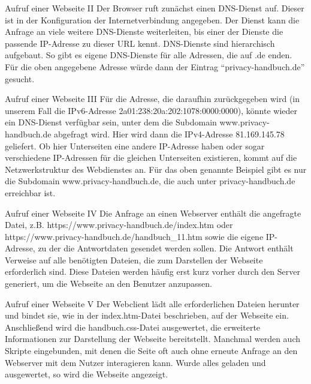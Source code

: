 \documentclass[hyperref={colorlinks,linkcolor=white}, utf8]{beamer}
\begin{document}
	\begin{frame}{Aufruf einer Webseite II}
		Der Browser ruft zunächst einen DNS-Dienst auf. Dieser ist in der Konfiguration der Internetverbindung angegeben. Der Dienst kann die Anfrage an viele weitere DNS-Dienste weiterleiten, bis einer der Dienste die passende IP-Adresse zu dieser URL kennt.
		DNS-Dienste sind hierarchisch aufgebaut. So gibt es eigene DNS-Dienste für alle Adressen, die auf .de enden. Für die oben angegebene Adresse würde dann der Eintrag \enquote{privacy-handbuch.de} gesucht.
	\end{frame}

	\begin{frame}{Aufruf einer Webseite III}
		Für die Adresse, die daraufhin zurückgegeben wird  (in unserem Fall die IPv6-Adresse 2a01:238:20a:202:1078:0000:0000), könnte wieder ein DNS-Dienst verfügbar sein, unter dem die Subdomain www.privacy-handbuch.de abgefragt wird. Hier wird dann die IPv4-Adresse 81.169.145.78 geliefert. Ob hier Unterseiten eine andere IP-Adresse haben oder sogar verschiedene IP-Adressen für die gleichen Unterseiten existieren, kommt auf die Netzwerkstruktur des Webdienstes an. Für das oben genannte Beispiel gibt es nur die Subdomain www.privacy-handbuch.de, die auch unter privacy-handbuch.de erreichbar ist.
	\end{frame}

	\begin{frame}{Aufruf einer Webseite IV}
		Die Anfrage an einen Webserver enthält die angefragte Datei, z.B. https://www.privacy-handbuch.de/index.htm oder https://www.privacy-handbuch.de/handbuch\_11.htm sowie die eigene IP-Adresse, zu der die Antwortdaten gesendet werden sollen.
		Die Antwort enthält Verweise auf alle benötigten Dateien, die zum Darstellen der Webseite erforderlich sind. Diese Dateien werden häufig erst kurz vorher durch den Server generiert, um die Webseite an den Benutzer anzupassen.
	\end{frame}

	\begin{frame}{Aufruf einer Webseite V}
		Der Webclient lädt alle erforderlichen Dateien herunter und bindet sie, wie in der     index.htm-Datei beschrieben, auf der Webseite ein. Anschließend wird die handbuch.css-Datei ausgewertet, die erweiterte Informationen zur Darstellung der Webseite bereitstellt. Manchmal werden auch Skripte eingebunden, mit denen die Seite oft auch ohne erneute Anfrage an den Webserver mit dem Nutzer interagieren kann. Wurde alles geladen und ausgewertet, so wird die Webseite angezeigt.
	\end{frame}
	
\end{document}
